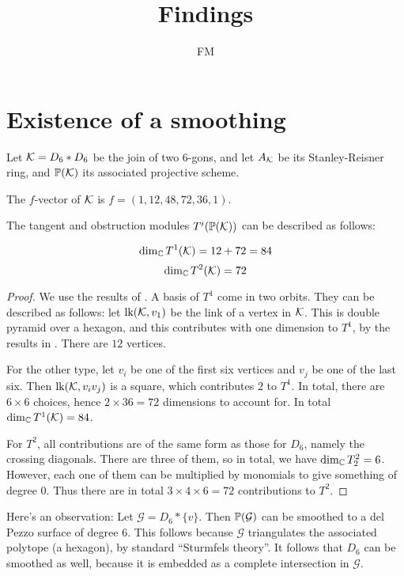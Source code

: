 \documentclass[11pt, english]{article}
\title{Findings}
\author{FM}
\date{}
\begin{document}
 
\maketitle
\section{Existence of a smoothing}

Let $\mathcal K=D_6 \ast D_6$ be the join of two $6$-gons, and let $A_\mathcal K$ be its Stanley-Reisner ring, and $\mathbb{P}(\mathcal K)$ its associated projective scheme. 

\begin{lemma}
The $f$-vector of $\mathcal K$ is $f=(1,12,48,72,36,1)$. 
\end{lemma}

The tangent and obstruction modules $T^i(\mathbb{P}(\mathcal K))$ can be described as follows: 

\begin{prop}
\[
\dim_{\mathbb{C}} T^1(\mathcal K) = 12+72 = 84
\]
\[
\dim_{\mathbb{C}} T^2(\mathcal K) = 72
\]
\end{prop}
\begin{proof}
We use the results of \cite{deforming_christophersen}. A basis of $T^1$ come in two orbits. They can be described as follows: let $\text{lk}(\mathcal K,v_1)$ be the link of a vertex in $\mathcal K$. This is double pyramid over a hexagon, and this contributes with one dimension to $T^1$, by the results in \cite{deforming_christophersen}. There are $12$ vertices.

For the other type, let $v_i$ be one of the first six vertices and $v_j$ be one of the last six. Then $\text{lk}(\mathcal K,v_iv_j)$ is a square, which contributes $2$ to $T^1$. In total, there are $6 \times 6$ choices, hence $2 \times 36=72$ dimensions to account for. In total $\dim_{\mathbb{C}} T^1(\mathcal K) = 84$.

For $T^2$, all contributions are of the same form as those for $D_6$, namely the crossing diagonals. There are three of them, so in total, we have $\dim_{\mathbb{C}} T^2_2=6$. However, each one of them can be multiplied by monomials to give something of degree $0$. Thus there are in total $3 \times 4 \times 6=72$ contributions to $T^2$.
\end{proof}

Here's an observation: Let $\mathcal G = D_6 \ast \{ v \}$. Then $\mathbb{P}(\mathcal G)$ can be smoothed to a del Pezzo surface of degree $6$. This follows because $\mathcal G$ triangulates the associated polytope (a hexagon), by standard ``Sturmfels theory''. It follows that $D_6$ can be smoothed as well, because it is embedded as a complete intersection in $\mathcal G$.
\end{document}
